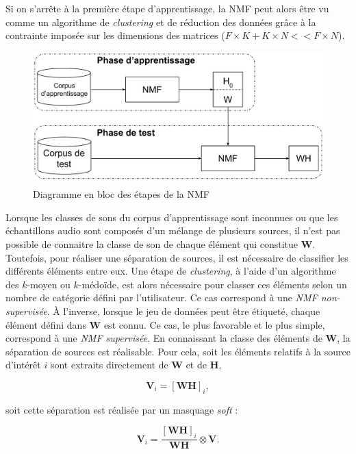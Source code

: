 Si on s'arrête à la première étape d'apprentissage, la NMF peut alors être vu comme un algorithme de \textit{clustering} \cite{li2006relationships} et de réduction des données grâce à la contrainte imposée sur les dimensions des matrices ($F \times K + K \times N << F \times N$). 

\begin{figure}[ht]
\centering
\includegraphics[width=.8\linewidth]{./figures/NMF/NMF_apprentissage.pdf}
\caption{Diagramme en bloc des étapes de la NMF}
\label{fig:supervised_learning}
\end{figure}


Lorsque les classes de sons du corpus d'apprentissage sont inconnues ou que les échantillons audio sont composés d'un mélange de plusieurs sources, il n'est pas possible de connaitre la classe de son de chaque élément qui constitue $\mathbf{W}$. Toutefois, pour réaliser une séparation de sources, il est nécessaire de classifier les différents éléments entre eux. Une étape de \textit{clustering}, à l'aide d'un algorithme des $k$-moyen ou $k$-médoïde, est alors nécessaire pour classer ces éléments selon un nombre de catégorie défini par l'utilisateur. Ce cas correspond à une \textit{NMF non-supervisée}.
À l'inverse, lorsque le jeu de données peut être étiqueté, chaque élément défini dans $\mathbf{W}$ est connu. Ce cas, le plus favorable et le plus simple, correspond à une \textit{NMF supervisée}. 
En connaissant la classe des éléments de $\mathbf{W}$, la séparation de sources est réalisable. Pour cela, soit les éléments relatifs à la source d'intérêt $i$ sont extraits directement de $\mathbf{W}$ et de $\mathbf{H}$,  

\begin{equation}
\mathbf{V}_i = \left[\mathbf{WH}\right]_i, 
\end{equation}

soit cette séparation est réalisée par un masquage \textit{soft} : 

\begin{equation}
\mathbf{V}_i = \frac{\left[\mathbf{WH}\right]_i}{\mathbf{WH}} \otimes \mathbf{V}.
\end{equation}
\\


